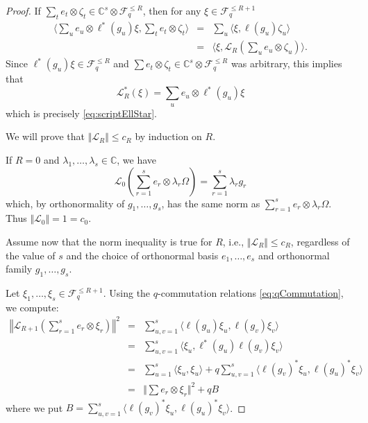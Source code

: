 \documentclass[11pt]{article}
\begin{document}
\begin{proof}
     If $\sum_t e_t \otimes \zeta_t \in \mathbb{C}^s \otimes \mathscr{F}_q^{\leq R}$, then for any $\xi\in \mathscr{F}_q^{\leq R+1}$
    \begin{eqnarray*}
       \langle  \sum_u  e_u \otimes \ell^*(g_u) \xi , \sum_t e_t \otimes \zeta_t 
       \rangle & =&  \sum_u \langle   \xi ,   \ell(g_u) \zeta_u \rangle  \\ & = & \langle \xi, \mathscr{L}_{R}(\sum_u e_u \otimes \zeta_u)\rangle.  
    \end{eqnarray*} Since $\ell^*(g_u)\xi \in \mathscr{F}_q^{\leq R}$ and $\sum e_t\otimes \zeta_t \in \mathbb{C}^s \otimes \mathscr{F}_q^{\leq R}$ was arbitrary, this implies that
    \begin{equation*}
    \mathscr{L}_R^* (\xi) = \sum_u e_u \otimes \ell^*(g_u) \xi
    \end{equation*} which is precisely \eqref{eq:scriptEllStar}.
    
    We will prove that $\Vert \mathscr{L}_R\Vert \leq c_R $ by induction on $R$.  

    If $R=0$ and $\lambda_1,\dots,\lambda_s\in \mathbb{C}$, we have $$\mathscr{L}_0 \left(\sum_{r=1}^s e_r \otimes \lambda_r\Omega \right) = \sum_{r=1}^s \lambda_r g_r$$  which, by orthonormality of $g_1,\dots,g_s$, has the same norm as $\sum_{r=1}^s  e_r\otimes \lambda_r \Omega $.  Thus $\Vert \mathscr{L}_0 \Vert = 1 =c_0$. 

    Assume now that the norm inequality is true for $R$, i.e., $\Vert \mathscr{L}_R \Vert \leq c_R$, regardless of the value of $s$ and the choice of orthonormal basis $e_1,\dots,e_s$ and orthonormal family $g_1,\dots,g_s$.    
    
    Let $\xi_1,\dots,\xi_s\in \mathscr{F}_q^{\leq R+1}$.  
    Using the $q$-commutation relations \eqref{eq:qCommutation}, we compute:
    \begin{eqnarray*}
            \left\Vert \mathscr{L}_{R+1} \left(\sum_{r=1}^s e_r \otimes \xi_r \right) \right \Vert^2 
            &=& \sum_{u,v=1}^s \langle \ell(g_u) \xi_u, \ell( g_v ) \xi_v \rangle\\ 
            &=& \sum_{u,v=1}^s \langle \xi_u, \ell^*(g_u)\ell(g_v) \xi_v \rangle \\
            &=& \sum_{u=1}^s \langle \xi_u,\xi_u\rangle + q \sum_{u,v=1}^s 
                \langle \ell(g_v)^* \xi_u , \ell(g_u)^*\xi_v \rangle \\ 
                &=& \Vert \sum e_r \otimes \xi_r\Vert^2 + q B
    \end{eqnarray*}
    where we put $B = \sum_{u,v=1}^s 
                \langle \ell(g_v)^* \xi_u , \ell(g_u)^*\xi_v \rangle$.  


\end{proof}
\end{document}
